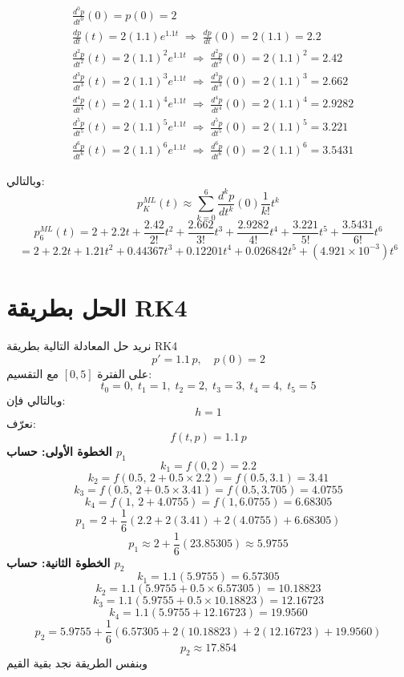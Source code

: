 \begin{example}
\[\]
\begin{align*}
	&\frac{d^0 p}{dt^0}(0) = p(0) = 2\\[5pt]
	&\frac{d p}{dt}(t) = 2(1.1)e^{1.1t} \;\Rightarrow\; \frac{d p}{dt}(0)=2(1.1)=2.2\\[5pt]
	&\frac{d^2 p}{dt^2}(t) = 2(1.1)^2 e^{1.1t} \;\Rightarrow\; \frac{d^2 p}{dt^2}(0)=2(1.1)^2 = 2.42\\[5pt]
	&\frac{d^3 p}{dt^3}(t) = 2(1.1)^3 e^{1.1t} \;\Rightarrow\; \frac{d^3 p}{dt^3}(0)=2(1.1)^3 = 2.662\\[5pt]
	&\frac{d^4 p}{dt^4}(t) = 2(1.1)^4 e^{1.1t} \;\Rightarrow\; \frac{d^4 p}{dt^4}(0)=2(1.1)^4 = 2.9282\\[5pt]
	&\frac{d^5 p}{dt^5}(t) = 2(1.1)^5 e^{1.1t} \;\Rightarrow\; \frac{d^5 p}{dt^5}(0)=2(1.1)^5 = 3.221\\[5pt]
	&\frac{d^6 p}{dt^6}(t) = 2(1.1)^6 e^{1.1t} \;\Rightarrow\; \frac{d^6 p}{dt^6}(0)=2(1.1)^6 = 3.5431
\end{align*}

وبالتالي:
\[
p_K^{ML}(t) \approx \sum_{k=0}^{6} \frac{d^k p}{dt^k}(0)\frac{1}{k!} t^k 
\]
\[
p_6^{ML}(t) = 2 + 2.2 t + \frac{2.42}{2!} t^2 + \frac{2.662}{3!} t^3 + \frac{2.9282}{4!} t^4 + \frac{3.221}{5!} t^5 + \frac{3.5431}{6!} t^6
\]
\[
= 2 + 2.2 t + 1.21 t^2 + 0.44367t^3 + 0.12201 t^4 + 0.026842 t^5 + (4.921 \times 10^{-3} ) t^6
 \]

\section*{الحل بطريقة RK4}
	نريد حل المعادلة التالية بطريقة RK4
	\[
	p' = 1.1\,p, \quad p(0)=2
	\]
	على الفترة \([0,5]\) مع التقسيم:
	\[
	t_0=0,\; t_1=1,\; t_2=2,\; t_3=3,\; t_4=4,\; t_5=5
	\]
	وبالتالي فإن:
	\[
	h = 1
	\]
	نعرّف:
	\[
	f(t,p) = 1.1\,p
	\]
	\textbf{الخطوة الأولى: حساب \( p_1 \)}
	\[
	k_1 = f(0,2) = 2.2
	\]
	\[
	k_2 = f\left(0.5,\, 2 + 0.5 \times 2.2 \right) = f(0.5, 3.1) = 3.41
	\]
	\[
	k_3 = f\left(0.5,\, 2 + 0.5 \times 3.41 \right) = f(0.5, 3.705) = 4.0755
	\]
	\[
	k_4 = f(1,\, 2 + 4.0755) = f(1, 6.0755) = 6.68305
	\]
	\[
	p_1 = 2 + \frac{1}{6}(2.2 + 2(3.41) + 2(4.0755) + 6.68305)
	\]
	\[
	p_1 \approx 2 + \frac{1}{6}(23.85305) \approx 5.9755
	\]
	\textbf{الخطوة الثانية: حساب \( p_2 \)}
	\[
	k_1 = 1.1(5.9755) = 6.57305
	\]
	\[
	k_2 = 1.1(5.9755 + 0.5 \times 6.57305) = 10.18823
	\]
	\[
	k_3 = 1.1(5.9755 + 0.5 \times 10.18823) = 12.16723
	\]
	\[
	k_4 = 1.1(5.9755 + 12.16723) = 19.9560
	\]
	\[
	p_2 = 5.9755 + \frac{1}{6}(6.57305 + 2(10.18823) + 2(12.16723) + 19.9560)
	\]
	\[
	p_2 \approx 17.854
	\]
وبنفس الطريقة نجد بقية القيم


\end{example}
